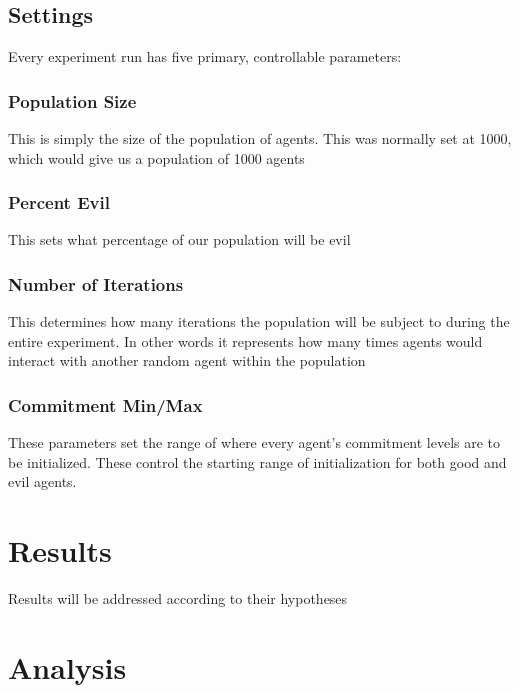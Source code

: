 \documentclass[]{article}
\begin{document}
\subsection{Settings}
Every experiment run has five primary, controllable parameters:
\subsubsection{Population Size}
This is simply the size of the population of agents. This was normally set at 1000, which would give us a population of 1000 agents
\subsubsection{Percent Evil}
This sets what percentage of our population will be evil
\subsubsection{Number of Iterations}
This determines how many iterations the population will be subject to during the entire experiment. In other words it represents how many times agents would interact with another random agent within the population 
\subsubsection{Commitment Min/Max}
These parameters set the range of where every agent's commitment levels are to be initialized. These control the starting range of initialization for both good and evil agents.



\section{Results}
Results will be addressed according to their hypotheses


\section{Analysis}

\end{document}

